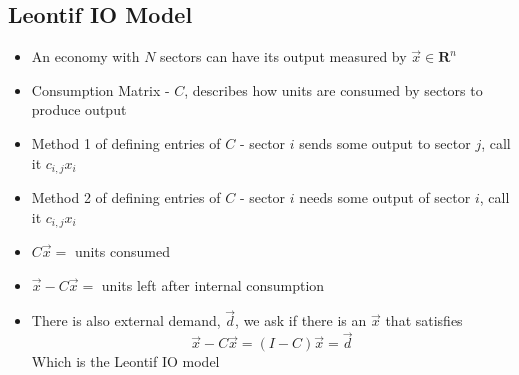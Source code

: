 \documentclass{article}
\begin{document}
\subsection{Leontif IO Model}
\begin{itemize}
    \item An economy with \(N\) sectors can have its output measured by \(\vec{x}\in \textbf{R}^n\)
    \item Consumption Matrix - \(C\), describes how units are consumed by sectors to produce output 
    \item Method 1 of defining entries of \(C\) - sector \(i\) sends some output to sector \(j\), call it \(c_{i,j}x_i\)
    \item Method 2 of defining entries of \(C\) - sector \(i\) needs some output of sector \(i\), call it \(c_{i,j}x_i\)
    \item \(C\vec{x}=\) units consumed
    \item \(\vec{x}-C\vec{x}=\) units left after internal consumption 
    \item There is also external demand, \(\vec{d}\), we ask if there is an \(\vec{x}\) that satisfies \[\vec{x}-C\vec{x}=(I-C)\vec{x}=\vec{d}\] Which is the Leontif IO model 
\end{itemize}
\end{document}
